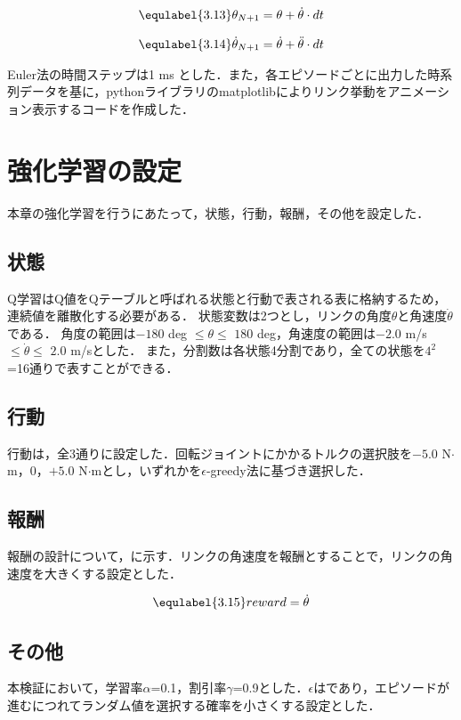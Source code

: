 \begin{eqnarray}
  \equlabel{3.13}
  \theta_{N + 1} = \theta + \dot{\theta} \cdot dt
\end{eqnarray}

\begin{eqnarray}
  \equlabel{3.14}
  \dot{\theta}_{N + 1} = \dot{\theta} + \ddot{\theta} \cdot dt
\end{eqnarray}

Euler法の時間ステップは1 ms とした．また，各エピソードごとに出力した時系列データを基に，pythonライブラリのmatplotlibによりリンク挙動をアニメーション表示するコードを作成した．
\section{強化学習の設定}
本章の強化学習を行うにあたって，状態，行動，報酬，その他を設定した．
\subsection{状態}
Q学習はQ値をQテーブルと呼ばれる状態と行動で表される表に格納するため，連続値を離散化する必要がある．
状態変数は2つとし，リンクの角度$\theta$と角速度$\dot{\theta}$である．
角度の範囲は$-180$ deg $\leq \theta \leq$ $180$ deg，角速度の範囲は$-2.0$ m/s $\leq \dot{\theta} \leq$ $2.0$ m/sとした．
また，分割数は各状態4分割であり，全ての状態を$4^{2}$=16通りで表すことができる．
\subsection{行動}
行動は，全3通りに設定した．回転ジョイントにかかるトルクの選択肢を$-5.0$ N$\cdot$m，$0$，$+5.0$ N$\cdot$mとし，いずれかを$\epsilon$-greedy法に基づき選択した．
\subsection{報酬}
報酬の設計について，に示す．リンクの角速度を報酬とすることで，リンクの角速度を大きくする設定とした．

\begin{eqnarray}
  \equlabel{3.15}
  reward = \dot{\theta}
\end{eqnarray}

\subsection{その他}
本検証において，学習率$\alpha$=0.1，割引率$\gamma$=0.9とした．$\epsilon$はであり，エピソードが進むにつれてランダム値を選択する確率を小さくする設定とした．

